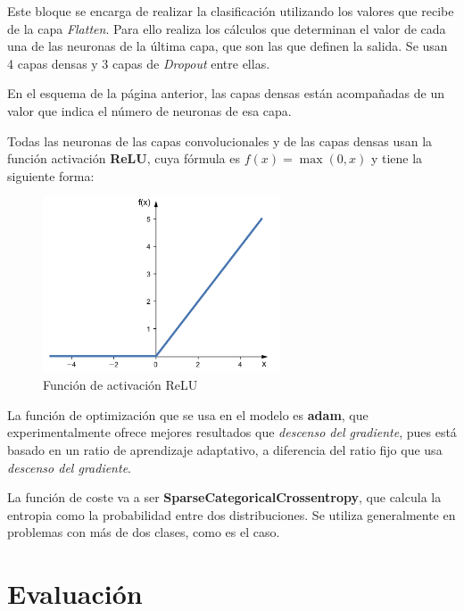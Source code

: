 \documentclass{uc3mpracticas}
\begin{document}
\begin{enumerate}
    Este bloque se encarga de realizar la clasificación utilizando los valores que recibe de la capa \textit{Flatten}. Para ello realiza los cálculos que determinan el valor de cada una de las neuronas de la última capa, que son las que definen la salida. Se usan 4 capas densas y 3 capas de \textit{Dropout} entre ellas.

    \vspace{2mm}

    En el esquema de la página anterior, las capas densas están acompañadas de un valor que indica el número de neuronas de esa capa.

  \end{enumerate}


  Todas las neuronas de las capas convolucionales y de las capas densas usan la función activación \textbf{ReLU}, cuya fórmula es $ f(x) = \max(0, x) $ y tiene la siguiente forma:

  \begin{figure}[H]
    \centering
    \includegraphics[width=70mm]{Images/ReLU.png}
    \caption{Función de activación ReLU}
  \end{figure}

  La función de optimización que se usa en el modelo es \textbf{adam}, que experimentalmente ofrece mejores resultados que \textit{descenso del gradiente}, pues está basado en un ratio de aprendizaje adaptativo, a diferencia del ratio fijo que usa \textit{descenso del gradiente}.

  \vspace{2mm}

  La función de coste va a ser \textbf{SparseCategoricalCrossentropy}, que calcula la entropia como la probabilidad entre dos distribuciones. Se utiliza generalmente en problemas con más de dos clases, como es el caso.



  \section{Evaluación}
\end{document}
